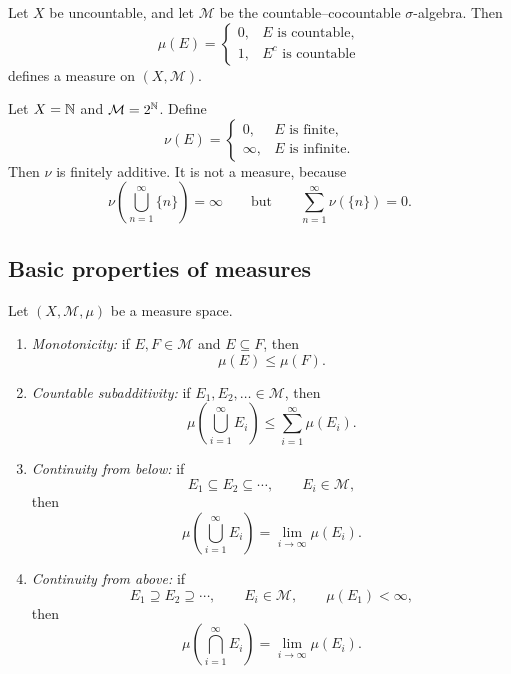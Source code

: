 \begin{example}
  Let $X$ be uncountable, and let $\mathcal M$ be the
  countable--cocountable $\sigma$-algebra. Then
  \[
    \mu(E)=
    \begin{cases}
      0,&E\text{ is countable},\\
      1,&E^c\text{ is countable}
    \end{cases}
  \]
  defines a measure on $(X,\mathcal M)$.
\end{example}

\begin{example}
  Let $X=\mathbb{N}$ and $\mathcal M=2^{\mathbb{N}}$. Define
  \[
    \nu(E)=
    \begin{cases}
      0,&E\text{ is finite},\\
      \infty,&E\text{ is infinite}.
    \end{cases}
  \]
  Then $\nu$ is finitely additive. It is not a measure, because
  \[
    \nu\left(\bigcup_{n=1}^{\infty}\{n\}\right)=\infty
    \qquad\text{but}\qquad
    \sum_{n=1}^{\infty}\nu(\{n\})=0.
  \]
\end{example}

\subsection{Basic properties of measures}

\begin{theorem}\label{thm:basic-measure-properties}
  Let $(X,\mathcal M,\mu)$ be a measure space.
  \begin{enumerate}[label=(\alph*)]
    \item \emph{Monotonicity:} if $E,F\in\mathcal M$ and $E\subseteq F$,
      then
      \[
        \mu(E)\leq\mu(F).
      \]
    \item \emph{Countable subadditivity:} if
      $E_1,E_2,\ldots\in\mathcal M$, then
      \[
        \mu\left(\bigcup_{i=1}^{\infty}E_i\right)
        \leq\sum_{i=1}^{\infty}\mu(E_i).
      \]
    \item \emph{Continuity from below:} if
      \[
        E_1\subseteq E_2\subseteq\cdots,
        \qquad E_i\in\mathcal M,
      \]
      then
      \[
        \mu\left(\bigcup_{i=1}^{\infty}E_i\right)
        =\lim_{i\to\infty}\mu(E_i).
      \]
    \item \emph{Continuity from above:} if
      \[
        E_1\supseteq E_2\supseteq\cdots,
        \qquad E_i\in\mathcal M,
        \qquad \mu(E_1)<\infty,
      \]
      then
      \[
        \mu\left(\bigcap_{i=1}^{\infty}E_i\right)
        =\lim_{i\to\infty}\mu(E_i).
      \]
  \end{enumerate}
\end{theorem}

